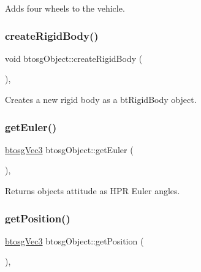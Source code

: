 Adds four wheels to the vehicle. \mbox{\label{classbtosgObject_a029dbe9134fa94e7355799f67fb2cd6d}} 
\subsubsection{\texorpdfstring{create\+Rigid\+Body()}{createRigidBody()}}
{\footnotesize\ttfamily void btosg\+Object\+::create\+Rigid\+Body (\begin{DoxyParamCaption}{ }\end{DoxyParamCaption})\hspace{0.3cm}{\ttfamily [inline]}, {\ttfamily [inherited]}}

Creates a new rigid body as a bt\+Rigid\+Body object. \mbox{\label{classbtosgObject_a2019ec63bde02b72600450c7c985e77a}} 
\subsubsection{\texorpdfstring{get\+Euler()}{getEuler()}}
{\footnotesize\ttfamily \hyperlink{classbtosgVec3}{btosg\+Vec3} btosg\+Object\+::get\+Euler (\begin{DoxyParamCaption}{ }\end{DoxyParamCaption})\hspace{0.3cm}{\ttfamily [inline]}, {\ttfamily [inherited]}}

Returns object\textquotesingle{}s attitude as H\+PR Euler angles. \mbox{\label{classbtosgObject_a3dadd5da8f2a312e44a039446b93d4cd}} 
\subsubsection{\texorpdfstring{get\+Position()}{getPosition()}}
{\footnotesize\ttfamily \hyperlink{classbtosgVec3}{btosg\+Vec3} btosg\+Object\+::get\+Position (\begin{DoxyParamCaption}{ }\end{DoxyParamCaption})\hspace{0.3cm}{\ttfamily [inline]}, {\ttfamily [inherited]}}

